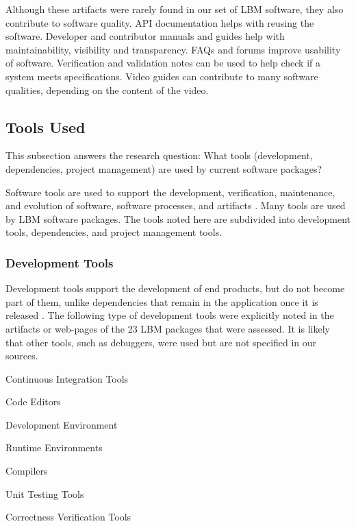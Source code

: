 \documentclass[12pt, notitlepage]{article}
\begin{document}
Although these artifacts were rarely found in our set of LBM software, they also contribute to software quality. API documentation helps with reusing the software. Developer and contributor manuals and guides help with maintainability, visibility and transparency. FAQs and forums improve usability of software. Verification and validation notes can be used to help check if a system meets specifications. Video guides can contribute to many software qualities, depending on the content of the video. 

\subsection{Tools Used}\label{tools}

This subsection answers the research question: What tools (development, dependencies, project management) are used by current software packages?

Software tools are used to support the development, verification, maintenance, and evolution of software, software processes, and artifacts \citep{ghezzi1991fundamentals}. Many tools are used by LBM software packages. The tools noted here are subdivided into development tools, dependencies, and project management tools.

\subsubsection{Development Tools}

Development tools support the development of end products, but do not become part of them, unlike dependencies that remain in the application once it is released \citep{ghezzi1991fundamentals}. The following type of development tools were explicitly noted in the artifacts or web-pages of the 23 LBM packages that were assessed. It is likely that other tools, such as debuggers, were used but are not specified in our sources.

	\begin{multicols}{2}	
		\begin{itemize}
		\end{itemize}
	\end{multicols}
\end{document}
